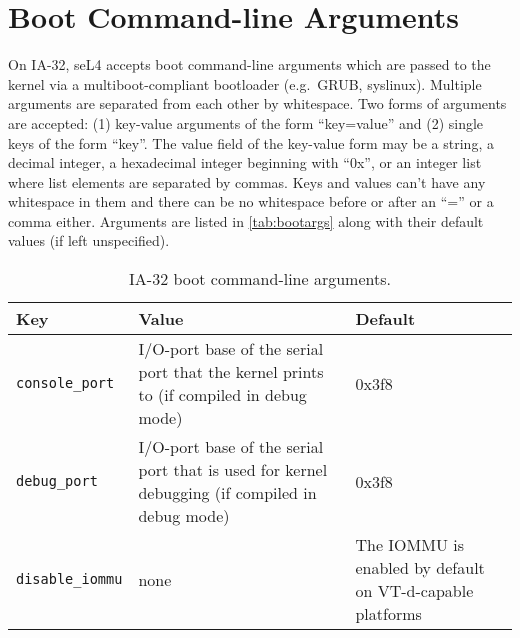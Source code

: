 \ifxeightsix
\section{Boot Command-line Arguments}

On IA-32, seL4 accepts boot command-line arguments which are passed to the
kernel via a multiboot-compliant bootloader (e.g.\ GRUB, syslinux). Multiple
arguments are separated from each other by whitespace. Two forms of arguments
are accepted:
(1) key-value arguments of the form ``key=value'' and (2) single keys of the
form ``key''. The value field of the key-value form may be a string, a decimal
integer, a hexadecimal integer beginning with ``0x'', or an integer list where
list elements are separated by commas.
Keys and values can't have any whitespace in them and there can be no
whitespace before or after an ``='' or a comma either.
Arguments are listed in \autoref{tab:bootargs} along with their default values (if left unspecified).


\begin{table}[htb]
    \caption{IA-32 boot command-line arguments.}
        \begin{tabularx}{\textwidth}{lXX}
            \toprule
              Key & Value & Default \\
            \midrule
            \texttt{console\_port} &
            I/O-port base of the serial port that the kernel prints to
            (if compiled in debug mode) &
            0x3f8 \\
            \texttt{debug\_port} &
            I/O-port base of the serial port that is used for kernel debugging
            (if compiled in debug mode) &
            0x3f8 \\
            \texttt{disable\_iommu} &
            none &
            The IOMMU is enabled by default on VT-d-capable platforms \\
            \bottomrule
        \end{tabularx}
    \label{tab:bootargs}
\end{table}
\fi
